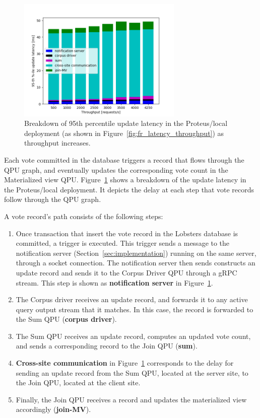 \begin{figure}[H]
\centering
  \includegraphics[width=0.7\textwidth]{./figures/evaluation/fr_latency_throughput_breakdown.png}
  \caption{Breakdown of 95th percentile update latency in the Proteus/local deployment
  (as shown in Figure~\ref{fig:fr_latency_throughput}) as throughput increases.}
  \label{fig:fr_latency_throughput_breakdown}
\end{figure}

Each vote committed in the database triggers a record that flows through the QPU graph, and eventually updates the corresponding
vote count in the Materialized view QPU.
Figure~\ref{fig:fr_latency_throughput_breakdown} shows a breakdown of the update latency in the Proteus/local
deployment.
It depicts the delay at each step that vote records follow through the QPU graph.

A vote record's path consists of the following steps:
\begin{enumerate}
  \item Once transaction that insert the vote record in the Lobsters database is committed,
  a trigger is executed.
  This trigger sends a message to the notification server (Section~\ref{sec:implementation}) running on the same server,
  through a socket connection.
  The notification server then sends constructs an update record and sends it to the Corpus Driver QPU through a gRPC stream.
  This step is shown as \textbf{notification server} in Figure~\ref{fig:fr_latency_throughput_breakdown}.

  \item The Corpus driver receives an update record, and forwards it to any active query output stream that it matches.
  In this case, the record is forwarded to the Sum QPU (\textbf{corpus driver}).

  \item The Sum QPU receives an update record, computes an updated vote count,
  and sends a corresponding record to the Join QPU (\textbf{sum}).

  \item \textbf{Cross-site communication} in Figure~\ref{fig:fr_latency_throughput_breakdown} corresponds to the delay for
  sending an update record from the Sum QPU, located at the server site, to the Join QPU, located at the client site.

  \item Finally, the Join QPU receives a record and updates the materialized view accordingly (\textbf{join-MV}).

\end{enumerate}

